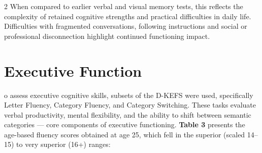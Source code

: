 \documentclass{article}
\begin{document}
\begin{multicols}{2}
When compared to earlier verbal and visual memory tests, this reflects the complexity of retained cognitive strengths and practical difficulties in daily life. Difficulties with fragmented conversations, following instructions and social or professional disconnection highlight continued functioning impact.
\section*{Executive Function}

o assess executive cognitive skills, subsets of the D-KEFS were used, specifically Letter Fluency, Category Fluency, and Category Switching. These tasks evaluate verbal productivity, mental flexibility, and the ability to shift between semantic categories — core components of executive functioning. \textbf{Table 3} presents the age-based fluency scores obtained at age 25, which fell in the superior (scaled 14–15) to very superior (16+) ranges: 
\end{multicols}

\end{document}
